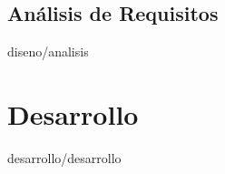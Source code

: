 \documentclass[epsbased,copyright,final,printable,covers,extendedindex,firstnumbered,tfg,gnuplot]{tfgtfmthesisuam}
\begin{document}
  \section{Análisis de Requisitos\label{SEC:ANALISIS}}{diseno/analisis}
\begin{comment}
  \section{Estructurar el documento\label{SEC:ESTRUCTURAR}}{primpas/estructuradoc}
  \section{Enlazar la bibliografía\label{SEC:ENLAZBIBLIOGRAFIA}}{primpas/enlazarbib}
\end{comment}

\chapter{Desarrollo\label{CAP:DESARROLLO}}{desarrollo/desarrollo}
\end{document}

